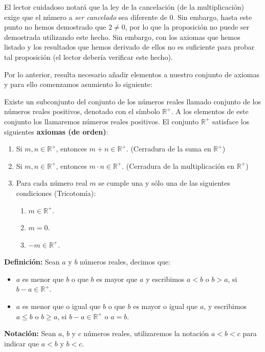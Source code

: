 \documentclass[11pt]{article}
\newcommand{\R}{\mathbb{R}}
\begin{document}
El lector cuidadoso notará que la ley de la cancelación (de la multiplicación) exige que el número a \textit{ser cancelado} sea diferente de $0$. Sin embargo, hasta este punto no hemos demostrado que $2\neq 0$, por lo que la proposición no puede ser demostrada utilizando este hecho. Sin embargo, con los axiomas que hemos listado y los resultados que hemos derivado de ellos no es suficiente para probar tal proposición (el lector debería verificar este hecho).

Por lo anterior, resulta necesario añadir elementos a nuestro conjunto de axiomas y para ello comenzamos asumiento lo siguiente:

Existe un subconjunto del conjunto de los números reales llamado conjunto de los números reales positivos, denotado con el símbolo $\R^+$. A los elementos de este conjunto los llamaremos números reales positivos. El conjunto $\R^+$ satisface los siguientes \textbf{axiomas (de orden)}:
%
\begin{enumerate}[label=O\arabic*)]
\item Si $m, n \in \R^+$, entonces $m + n \in \R^+$. (Cerradura de la suma en $\R^+$)
\item Si $m, n \in \R^+$, entonces $m \cdot n \in \R^+$. (Cerradura de la multiplicación en $\R^+$)
\item Para cada número real $m$ se cumple una y sólo una de las siguientes condiciones (Tricotomía):
    \begin{enumerate}[label=\roman*)]
    \item $m \in \R^+$.
    \item $m = 0$.
    \item $-m \in \R^+$.\
    \end{enumerate}
\end{enumerate}
%
\textbf{Definición:} Sean $a$ y $b$ números reales, decimos que:%
%
\begin{itemize}
    \item $a$ es menor que $b$ o que $b$ es mayor que $a$ y escribimos $a<b$ o $b>a$, si $b-a \in \R^+$.
    \item $a$ es menor que o igual que $b$ o que $b$ es mayor o igual que $a$, y escribimos $a \leq b$ o $b \geq a$, si $b - a \in \R^+$ o $a = b$.
\end{itemize}

\textbf{Notación:} Sean $a$, $b$ y $c$ números reales, utilizaremos la notación $a<b<c$ para indicar que $a<b$ y $b<c$.

\pagebreak
\end{document}
